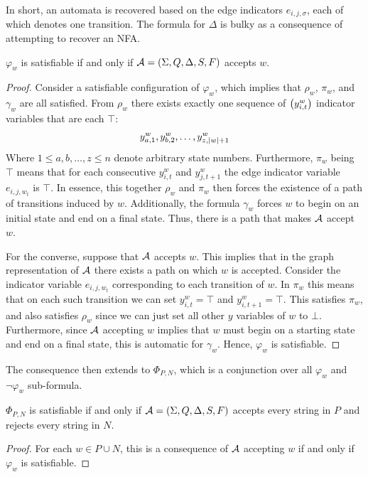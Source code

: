 In short, an automata is recovered based on the edge indicators
\(e_{i, j, \sigma}\),
each of which denotes one transition.
The formula for \(\Delta\) is bulky as a consequence of attempting to
recover an NFA.

\begin{theorem}
  \(\varphi_w\) is satisfiable if and only if
  \(\mathcal{A} = \left(\Sigma, Q, \Delta, S, F\right)\) accepts \(w\).
\end{theorem}
\begin{proof}
  Consider a satisfiable configuration of \(\varphi_w\),
  which implies that \(\rho_w\), \(\pi_w\), and \(\gamma_w\)
  are all satisfied.
  From \(\rho_w\)
  there exists exactly one sequence of \(\left(y_{i, t}^w\right)\)
  indicator variables that are each \(\top\):
  \begin{align*}
    y_{a, 1}^w, y_{b, 2}^w, \ldots, y_{z, \left\lvert w\right\rvert + 1}^w
  \end{align*}
  Where \(1 \leq a, b, \ldots, z \leq n\) denote arbitrary state numbers.
  Furthermore, \(\pi_w\) being \(\top\) means that for each consecutive
  \(y_{i, t}^w\) and \(y_{j, t + 1}^w\) the edge indicator variable
  \(e_{i, j, w_{t}}\) is \(\top\).
  In essence, this together \(\rho_w\) and \(\pi_w\) then forces
  the existence of a path of transitions induced by \(w\).
  Additionally, the formula \(\gamma_w\) forces \(w\) to begin on an
  initial state and end on a final state.
  Thus, there is a path that makes \(\mathcal{A}\) accept \(w\).

  For the converse, suppose that \(\mathcal{A}\) accepts \(w\).
  This implies that in the graph representation of \(\mathcal{A}\)
  there exists a path on which \(w\) is accepted.
  Consider the indicator variable \(e_{i, j, w_t}\) corresponding to each
  transition of \(w\).
  In \(\pi_w\) this means that on each such transition we can set
  \(y_{i, t}^w = \top\) and \(y_{i, t + 1}^w = \top\).
  This satisfies \(\pi_w\),
  and also satisfies \(\rho_w\) since we can just set all other
  \(y\) variables of \(w\) to \(\bot\).
  Furthermore, since \(\mathcal{A}\) accepting \(w\) implies that
  \(w\) must begin on a starting state and end on a final state,
  this is automatic for \(\gamma_w\).
  Hence, \(\varphi_w\) is satisfiable.

\end{proof}

The consequence then extends to \(\Phi_{P, N}\),
which is a conjunction over all \(\varphi_w\) and \(\neg \varphi_w\)
sub-formula.

\begin{theorem}
  \(\Phi_{P, N}\) is satisfiable if and only if
  \(\mathcal{A} = \left(\Sigma, Q, \Delta, S, F\right)\) accepts every string
  in \(P\) and rejects every string in \(N\).
\end{theorem}
\begin{proof}
  For each \(w \in P \cup N\),
  this is a consequence of \(\mathcal{A}\) accepting \(w\)
  if and only if \(\varphi_w\) is satisfiable.
\end{proof}

